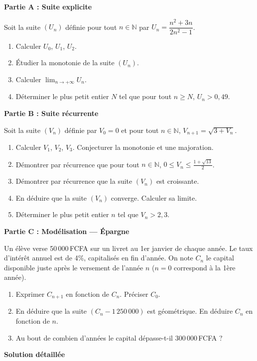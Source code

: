 \documentclass[11pt]{article}
\begin{document}
\begin{exoresolu}
\textbf{Partie A : Suite explicite}\par
Soit la suite $(U_n)$ définie pour tout $n \in \mathbb{N}$ par $U_n = \dfrac{n^2 + 3n}{2n^2 - 1}$.
\begin{enumerate}
    \item Calculer $U_0$, $U_1$, $U_2$.
    \item Étudier la monotonie de la suite $(U_n)$.
    \item Calculer $\displaystyle\lim_{n\to+\infty} U_n$.
    \item Déterminer le plus petit entier $N$ tel que pour tout $n \ge N$, $U_n > 0,49$.
\end{enumerate}

\textbf{Partie B : Suite récurrente}\par
Soit la suite $(V_n)$ définie par $V_0 = 0$ et pour tout $n \in \mathbb{N}$, $V_{n+1} = \sqrt{3 + V_n}$.
\begin{enumerate}
    \item Calculer $V_1$, $V_2$, $V_3$. Conjecturer la monotonie et une majoration.
    \item Démontrer par récurrence que pour tout $n \in \mathbb{N}$, $0 \le V_n \le \frac{1+\sqrt{13}}{2}$.
    \item Démontrer par récurrence que la suite $(V_n)$ est croissante.
    \item En déduire que la suite $(V_n)$ converge. Calculer sa limite.
    \item Déterminer le plus petit entier $n$ tel que $V_n > 2,3$.
\end{enumerate}

\textbf{Partie C : Modélisation — Épargne}\par
Un élève verse 50\,000\,FCFA sur un livret au 1er janvier de chaque année. Le taux d'intérêt annuel est de 4\%, capitalisés en fin d'année. On note $C_n$ le capital disponible juste après le versement de l'année $n$ ($n=0$ correspond à la 1ère année).
\begin{enumerate}
    \item Exprimer $C_{n+1}$ en fonction de $C_n$. Préciser $C_0$.
    \item En déduire que la suite $(C_n - 1\,250\,000)$ est géométrique. En déduire $C_n$ en fonction de $n$.
    \item Au bout de combien d'années le capital dépasse-t-il 300\,000\,FCFA ?
\end{enumerate}
\tcblower
\textbf{Solution détaillée}\par


\end{exoresolu}
\end{document}
